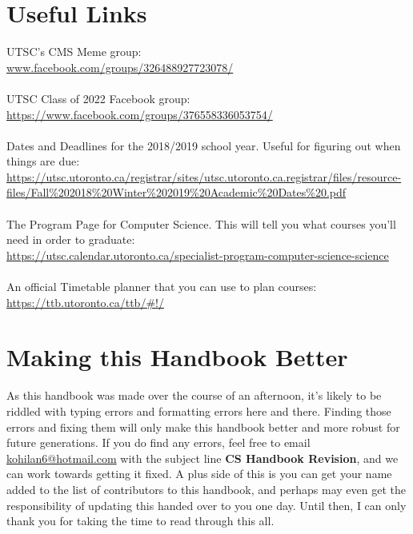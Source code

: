 \documentclass[11pt]{article}
\begin{document}
\section{Useful Links}
UTSC's CMS Meme group:\\ \url{www.facebook.com/groups/326488927723078/}\\\\
UTSC Class of 2022 Facebook group:\\ \url{https://www.facebook.com/groups/376558336053754/}\\\\
Dates and Deadlines for the 2018/2019 school year.  Useful for figuring out when things are due:\\ \url{https://utsc.utoronto.ca/registrar/sites/utsc.utoronto.ca.registrar/files/resource-files/Fall%202018%20Winter%202019%20Academic%20Dates%20.pdf}\\\\
The Program Page for Computer Science.  This will tell you what courses you'll need in order to graduate:\\ \url{https://utsc.calendar.utoronto.ca/specialist-program-computer-science-science}\\\\
An official Timetable planner that you can use to plan courses:\\
\url{https://ttb.utoronto.ca/ttb/#!/}

\section{Making this Handbook Better}
As this handbook was made over the course of an afternoon, it's likely to be riddled with typing errors and formatting errors here and there.  Finding those errors and fixing them will only make this handbook better and more robust for future generations.  If you do find any errors, feel free to email \href{ mailto:kohilan6@hotmail.com}{kohilan6@hotmail.com} with the subject line \textbf{CS Handbook Revision}, and we can work towards getting it fixed.  A plus side of this is you can get your name added to the list of contributors to this handbook, and perhaps may even get the responsibility of updating this handed over to you one day.  Until then, I can only thank you for taking the time to read through this all.
\end{document}
